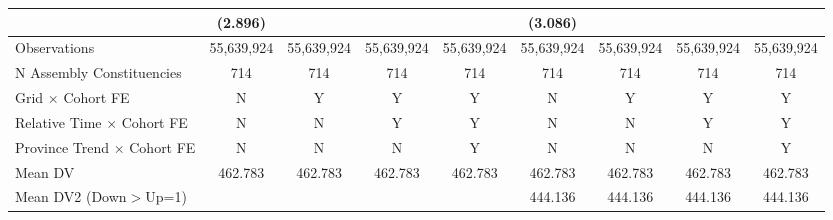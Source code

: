 {\begin{tabular}{l*{8}{c}}
            &     (2.896)         &                     &                     &                     &     (3.086)         &                     &                     &                     \\
\hline
Observations&  55,639,924         &  55,639,924         &  55,639,924         &  55,639,924         &  55,639,924         &  55,639,924         &  55,639,924         &  55,639,924         \\
N Assembly Constituencies&         714         &         714         &         714         &         714         &         714         &         714         &         714         &         714         \\
Grid $\times$ Cohort FE&           N         &           Y         &           Y         &           Y         &           N         &           Y         &           Y         &           Y         \\
Relative Time $\times$ Cohort FE&           N         &           N         &           Y         &           Y         &           N         &           N         &           Y         &           Y         \\
Province Trend $\times$ Cohort FE&           N         &           N         &           N         &           Y         &           N         &           N         &           N         &           Y         \\
Mean DV     &     462.783         &     462.783         &     462.783         &     462.783         &     462.783         &     462.783         &     462.783         &     462.783         \\
Mean DV2 (Down$>$Up=1)&                     &                     &                     &                     &     444.136         &     444.136         &     444.136         &     444.136         \\
\hline
\end{tabular}
}
